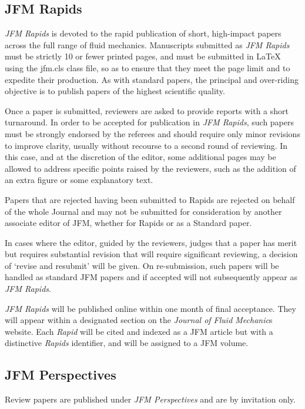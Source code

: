 \documentclass[lineno]{jfm}
\begin{document}
\subsection{JFM Rapids}
 {\it JFM Rapids} is devoted to the rapid publication of short, high-impact papers across the full range of fluid mechanics. Manuscripts submitted as {\it JFM Rapids}  must be strictly 10 or fewer printed pages, and must be submitted in {\LaTeX} using the jfm.cls class file, so as to ensure that they meet the page limit and to expedite their production.  As with standard papers, the principal and over-riding objective is to publish papers of the highest scientific quality.

Once a paper is submitted, reviewers are asked to provide reports with a short turnaround.  In order to be accepted for publication in {\it JFM Rapids}, such papers must be strongly endorsed by the referees and should require only minor revisions to improve clarity, usually without recourse to a second round of reviewing. In this case, and at the discretion of the editor, some additional pages may be allowed to address specific points raised by the reviewers, such as the addition of an extra figure or some explanatory text.

Papers that are rejected having been submitted to Rapids are rejected on behalf of the whole Journal and may not be submitted for consideration by another associate editor of JFM, whether for Rapids or as a Standard paper.

In cases where the editor, guided by the reviewers, judges that a paper has merit but requires substantial revision that will require significant reviewing, a decision of `revise and resubmit' will be given. On re-submission, such papers will be handled as standard JFM papers and if accepted will not subsequently appear as {\it JFM Rapids}.

{\it JFM Rapids} will be published online within one month of final acceptance.  They will appear within a designated section on the {\it Journal of Fluid Mechanic}s website.  Each {\it Rapid} will be cited and indexed as a JFM article but with a distinctive {\it Rapids} identifier, and will be assigned to a JFM volume.

\subsection{JFM Perspectives}
 Review papers are published under {\it JFM Perspectives } and are by invitation only.
\end{document}
